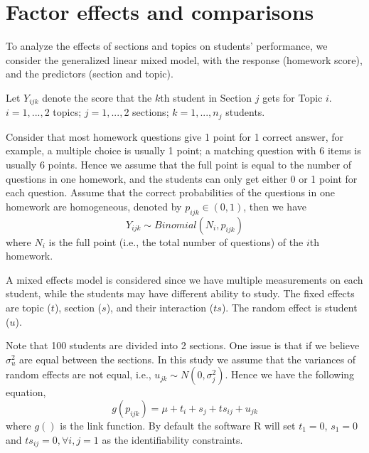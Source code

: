 \documentclass[12pt,nohyper]{tufte-handout}\usepackage[]{graphicx}\usepackage[]{color}
\begin{document}
\clearpage
\newpage{}
\section{Factor effects and comparisons}



To analyze the effects of sections and topics on students' performance, 
we consider the generalized linear mixed model, with the response 
(homework score), and the predictors 
(section and topic).

Let $Y_{ijk}$ denote the score that the $k$th student in Section 
$j$ gets for Topic $i$. $i=1,...,$2 topics; 
$j=1,...,$2 sections; $k=1,...,n_j$ students.

Consider that most homework questions give 1 point for 1 correct 
answer, for example, a multiple choice is usually 1 point;
a matching question with 6 items is usually 6 points.
Hence we assume that the full point is equal to the number of 
questions in one homework, and the students can only get 
either 0 or 1 point for each question. Assume that the correct 
probabilities of the questions in one homework are homogeneous, 
denoted by $p_{ijk} \in (0,1)$, then we have 
\[
Y_{ijk} \sim Binomial(N_i, p_{ijk})
\]
where $N_i$ is the full point (i.e., the total number of questions) 
of the $i$th homework.

A mixed effects model is considered since we have 
multiple measurements on each student, while the students 
may have different ability to study. The fixed effects are 
topic ($t$), section ($s$), and their interaction ($ts$). The 
random effect is student ($u$). 

Note that 100 students are divided into 
2 sections. One issue is that 
if we believe $\sigma_{u}^{2}$ are equal between 
the sections. In this study we assume that the variances of 
random effects are not equal, i.e., $u_{jk} \sim N(0,\sigma_{j}^{2})$.
Hence we have the following equation,
\[
g(p_{ijk}) = \mu + t_{i}+s_{j}+ts_{ij}+u_{jk}
\]
where $g()$ is the link function. By default the software R will
set $t_{1}=0$, $s_{1}=0$ and $ts_{ij}=0, \forall i,j = 1 $ 
as the identifiability constraints.
\end{document}
